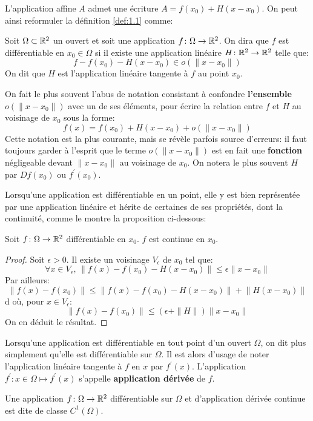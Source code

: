 L'application affine $A$ admet une écriture $A=f(x_0) + H(x-x_0)$. On peut ainsi reformuler la définition \ref{def:1.1} comme:
\begin{fdefn}\label{def:1.2}
Soit $\Omega \subset \mathbb{R}^2$ un ouvert et soit une application $f \colon \Omega \to \mathbb{R}^2$.
On dira que $f$ est différentiable en $x_0 \in \Omega$ si il existe une application linéaire $H \colon \mathbb{R}^2 \to \mathbb{R}^2$ telle que:
\[
f-f(x_0)-H(x-x_0) \in o(\|x-x_0\|)
\]
On dit que $H$ est l'application linéaire tangente à $f$ au point $x_0$.
\end{fdefn}
On fait le plus souvent l'abus de notation consistant à confondre \textbf{l'ensemble} $ o(\|x-x_0\|)$ avec un de ses éléments, pour écrire la relation entre $f$ et $H$  au voisinage de $x_0$ sous la forme:
\[
f(x) = f(x_0) + H(x-x_0) + o(\|x-x_0\|)
\]
Cette notation est la plus courante, mais se révèle parfois source d'erreurs: il faut toujours garder à l'esprit
que le terme $o(\|x-x_0\|)$ est en fait une \textbf{fonction} négligeable devant $\|x-x_0\|$ au voisinage de $x_0$.
On notera le plus souvent $H$ par $Df(x_0)$ ou $f^\prime(x_0)$.

Lorsqu'une application est différentiable en un point, elle y est bien représentée par une application linéaire et hérite de certaines de ses propriétés, dont la continuité, comme le montre la proposition ci-dessous:
\begin{fprop}\label{prop:1.1}
Soit $f \colon \Omega \to \mathbb{R}^2$ différentiable en $x_0$. $f$ est continue en $x_0$.
\end{fprop}
\begin{proof}
Soit $\epsilon > 0$. Il existe un voisinage $V_\epsilon$ de $x_0$ tel que:
\[
\forall x \in V_\epsilon, \, \left \| f(x) - f(x_0) -H(x-x_0) \right \| \leq \epsilon \|x-x_0\|
\]
Par ailleurs:
\[
\|f(x) -f(x_0)\| \leq \left \| f(x) - f(x_0) -H(x-x_0) \right \| + \left \| H(x-x_0) \right \|
\]
d où, pour $x \in V_\epsilon$:
\[
\|f(x) -f(x_0)\| \leq \left(\epsilon + \|H\| \right)\|x-x_0\|
\]
On en déduit le résultat.
\end{proof}
Lorsqu'une application est différentiable en tout point d'un ouvert $\Omega$, on dit plus simplement qu'elle est différentiable sur $\Omega$. Il est alors d'usage de noter l'application linéaire tangente à $f$ en $x$ par $f^\prime(x)$. L'application $f^\prime \colon x \in \Omega \mapsto f^\prime(x)$ s'appelle \textbf{application dérivée} de $f$.

\begin{fdefn}
Une application $f \colon \Omega \to \mathbb{R}^2$ différentiable sur $\Omega$ et d'application dérivée continue est dite de classe $C^1(\Omega)$.
\end{fdefn}

